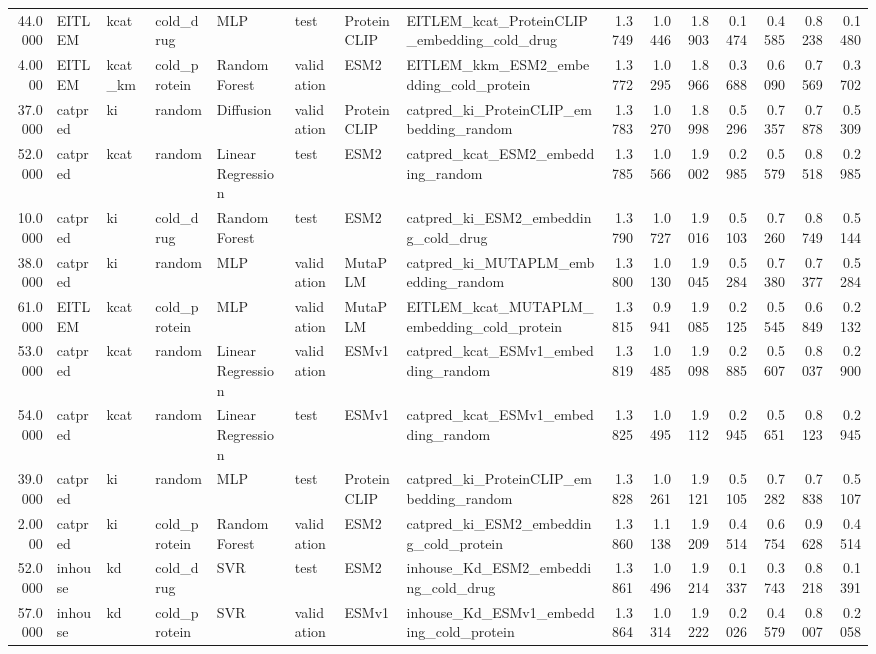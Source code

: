 \begin{tabular}{rlllllllrrrrrrr}
44.0000 & EITLEM & kcat & cold_drug & MLP & test & ProteinCLIP & EITLEM_kcat_ProteinCLIP_embedding_cold_drug & 1.3749 & 1.0446 & 1.8903 & 0.1474 & 0.4585 & 0.8238 & 0.1480 \\
4.0000 & EITLEM & kcat_km & cold_protein & Random Forest & validation & ESM2 & EITLEM_kkm_ESM2_embedding_cold_protein & 1.3772 & 1.0295 & 1.8966 & 0.3688 & 0.6090 & 0.7569 & 0.3702 \\
37.0000 & catpred & ki & random & Diffusion & validation & ProteinCLIP & catpred_ki_ProteinCLIP_embedding_random & 1.3783 & 1.0270 & 1.8998 & 0.5296 & 0.7357 & 0.7878 & 0.5309 \\
52.0000 & catpred & kcat & random & Linear Regression & test & ESM2 & catpred_kcat_ESM2_embedding_random & 1.3785 & 1.0566 & 1.9002 & 0.2985 & 0.5579 & 0.8518 & 0.2985 \\
10.0000 & catpred & ki & cold_drug & Random Forest & test & ESM2 & catpred_ki_ESM2_embedding_cold_drug & 1.3790 & 1.0727 & 1.9016 & 0.5103 & 0.7260 & 0.8749 & 0.5144 \\
38.0000 & catpred & ki & random & MLP & validation & MutaPLM & catpred_ki_MUTAPLM_embedding_random & 1.3800 & 1.0130 & 1.9045 & 0.5284 & 0.7380 & 0.7377 & 0.5284 \\
61.0000 & EITLEM & kcat & cold_protein & MLP & validation & MutaPLM & EITLEM_kcat_MUTAPLM_embedding_cold_protein & 1.3815 & 0.9941 & 1.9085 & 0.2125 & 0.5545 & 0.6849 & 0.2132 \\
53.0000 & catpred & kcat & random & Linear Regression & validation & ESMv1 & catpred_kcat_ESMv1_embedding_random & 1.3819 & 1.0485 & 1.9098 & 0.2885 & 0.5607 & 0.8037 & 0.2900 \\
54.0000 & catpred & kcat & random & Linear Regression & test & ESMv1 & catpred_kcat_ESMv1_embedding_random & 1.3825 & 1.0495 & 1.9112 & 0.2945 & 0.5651 & 0.8123 & 0.2945 \\
39.0000 & catpred & ki & random & MLP & test & ProteinCLIP & catpred_ki_ProteinCLIP_embedding_random & 1.3828 & 1.0261 & 1.9121 & 0.5105 & 0.7282 & 0.7838 & 0.5107 \\
2.0000 & catpred & ki & cold_protein & Random Forest & validation & ESM2 & catpred_ki_ESM2_embedding_cold_protein & 1.3860 & 1.1138 & 1.9209 & 0.4514 & 0.6754 & 0.9628 & 0.4514 \\
52.0000 & inhouse & kd & cold_drug & SVR & test & ESM2 & inhouse_Kd_ESM2_embedding_cold_drug & 1.3861 & 1.0496 & 1.9214 & 0.1337 & 0.3743 & 0.8218 & 0.1391 \\
57.0000 & inhouse & kd & cold_protein & SVR & validation & ESMv1 & inhouse_Kd_ESMv1_embedding_cold_protein & 1.3864 & 1.0314 & 1.9222 & 0.2026 & 0.4579 & 0.8007 & 0.2058 \\

\end{tabular}
